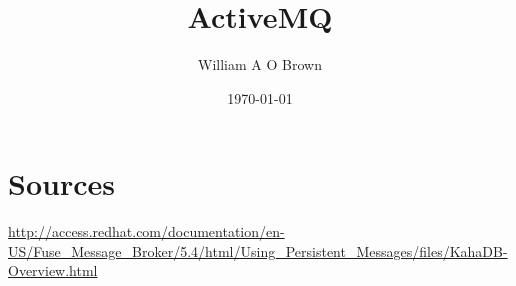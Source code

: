 \documentclass[a4paper,10pt]{article}
\begin{document}
\title{ActiveMQ}
\author{William A O Brown}
\date{\today}
\maketitle

\tableofcontents

% 






\section{Sources}
\url{http://access.redhat.com/documentation/en-US/Fuse_Message_Broker/5.4/html/Using_Persistent_Messages/files/KahaDB-Overview.html}


\end{document}
